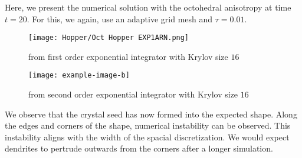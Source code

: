 Here, we present the numerical solution with the octohedral anisotropy at time $t=20$.
For this, we again, use an adaptive grid mesh and $\tau = 0.01$.
\begin{figure}[H]
    \centering
    \begin{minipage}{0.49\textwidth}
        \texttt{[image: Hopper/Oct Hopper EXP1ARN.png]} %
        \caption{from first order exponential integrator with Krylov size $16$}
        \label{fig:first order 8 0.5}
    \end{minipage}\hfill
    \centering
    \begin{minipage}{0.49\textwidth}
        \texttt{[image: example-image-b]} %
        \caption{from second order exponential integrator with Krylov size $16$}
        \label{fig:first order 10 0.5}
    \end{minipage}\hfill
\end{figure}
We observe that the crystal seed has now formed into the expected shape.
Along the edges and corners of the shape, numerical instability can be observed.
This instability aligns with the width of the spacial discretization.
We would expect dendrites to pertrude outwards from the corners after a longer simulation.

